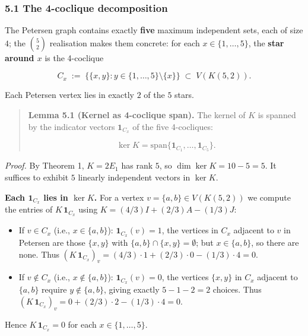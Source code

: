\documentclass[
]{article}
\providecommand{\tightlist}{%
  \setlength{\itemsep}{0pt}\setlength{\parskip}{0pt}}
\begin{document}
\subsubsection{5.1 The 4-coclique
decomposition}\label{the-4-coclique-decomposition}

The Petersen graph contains exactly \textbf{five} maximum independent
sets, each of size \(4\); the \(\binom{5}{2}\) realisation makes them
concrete: for each \(x \in \{1,\ldots,5\}\), the \textbf{star around
\(x\)} is the 4-coclique

\[
C_x \;:=\; \{ \{x, y\} : y \in \{1,\ldots,5\} \setminus \{x\} \}
        \;\subset\; V(K(5,2)).
\]

Each Petersen vertex lies in exactly \(2\) of the \(5\) stars.

\begin{quote}
\textbf{Lemma 5.1 (Kernel as 4-coclique span).} The kernel of \(K\) is
spanned by the indicator vectors \(\mathbf{1}_{C_x}\) of the five
4-cocliques:

\[
\ker K = \mathrm{span}\{\mathbf{1}_{C_1},\ldots,\mathbf{1}_{C_5}\}.
\]
\end{quote}

\emph{Proof.} By Theorem 1, \(K = 2 E_1\) has rank \(5\), so
\(\dim \ker K = 10 - 5 = 5\). It suffices to exhibit \(5\) linearly
independent vectors in \(\ker K\).

\textbf{Each \(\mathbf{1}_{C_x}\) lies in \(\ker K\).} For a vertex
\(v = \{a, b\} \in V(K(5,2))\) we compute the entries of
\(K\,\mathbf{1}_{C_x}\) using \(K = (4/3)I + (2/3)A - (1/3)J\):

\begin{itemize}
\tightlist
\item
  If \(v \in C_x\) (i.e., \(x \in \{a, b\}\)):
  \(\mathbf{1}_{C_x}(v) = 1\), the vertices in \(C_x\) adjacent to \(v\)
  in Petersen are those \(\{x, y\}\) with
  \(\{a, b\} \cap \{x, y\} = \emptyset\); but \(x \in \{a, b\}\), so
  there are none. Thus
  \((K\,\mathbf{1}_{C_x})_v = (4/3)\cdot 1 + (2/3)\cdot 0 - (1/3)\cdot 4 = 0\).
\item
  If \(v \notin C_x\) (i.e., \(x \notin \{a, b\}\)):
  \(\mathbf{1}_{C_x}(v) = 0\), the vertices \(\{x, y\}\) in \(C_x\)
  adjacent to \(\{a, b\}\) require \(y \notin \{a, b\}\), giving exactly
  \(5 - 1 - 2 = 2\) choices. Thus
  \((K\,\mathbf{1}_{C_x})_v = 0 + (2/3)\cdot 2 - (1/3)\cdot 4 = 0\).
\end{itemize}

Hence \(K\,\mathbf{1}_{C_x} = 0\) for each \(x \in \{1,\dots,5\}\).
\end{document}
